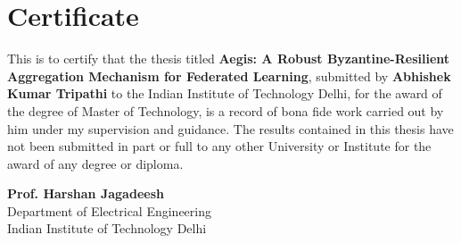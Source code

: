 \chapter*{Certificate}
This is to certify that the thesis titled \textbf{Aegis: A Robust Byzantine-Resilient Aggregation Mechanism for Federated Learning}, submitted by \textbf{Abhishek Kumar Tripathi} to the Indian Institute of Technology Delhi, for the award of the degree of Master of Technology, is a record of bona fide work carried out by him under my supervision and guidance. The results contained in this thesis have not been submitted in part or full to any other University or Institute for the award of any degree or diploma.

\vspace{2cm}
\begin{flushright}
\textbf{Prof. Harshan Jagadeesh} \\
Department of Electrical Engineering \\
Indian Institute of Technology Delhi
\end{flushright}
